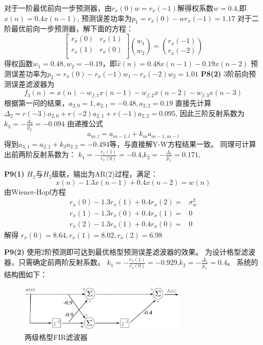 \documentclass{article}
\begin{document}
 对于一阶最优前向一步预测器，由$r_x(0)w=r_x(-1)$解得权系数$w=0.4$,即$\hat{x}(n)=0.4x(n-1)$,
 预测误差功率为$p_1=r_x(0)-wr_x(-1)=1.17$
 对于二阶最优前向一步预测器，解下面的方程：
\begin{equation}
\begin{bmatrix}
r_x(0) & r_x(1)\\
r_x(1) & r_x(0)\\
\end{bmatrix}\binom{w_1}{w_2}=
\binom{r_{x}(-1)}{r_{x}(-2)}
\end{equation}
得权函数$w_1=0.48,w_2=-0.19$，即$\hat{x}(n)=0.48x(n-1)-0.19x(n-2)$
预测误差功率为$p_2=r_x(0)-r_x(-1)w_1-r_x(-2)w_2=1.01$
\textbf{P8(2)}
3阶前向预测误差滤波器为
 \begin{equation}
f_3(n)=x(n)-w_{f,1}x(n-1)-w_{f,2}x(n-2)-w_{f,3}x(n-3) 
\end{equation}
根据第一问的结果，$a_{2,0}=1,a_{2,1}=-0.48,a_{2,2}=0.19$
直接先计算$\Delta_2=r(-3)a_{2,0}+r(-2)a_{2,1}+r(-1)a_{2,2}=0.095$,
因此三阶反射系数为$k_3=-\frac{\Delta_2}{p_2}=-0.094$
由递推公式
\begin{equation}
a_{m,l}=a_{m-1,l}+k_m a_{m-1,m-l}
\end{equation}
得到$a_{3,1}=a_{2,1}+k_3 a_{2,2}=-0.494$等，与直接解Y-W方程结果一致。
同理可计算出前两阶反射系数为：
$k_1=-\frac{r_x(1)}{r_x(0)}=-0.4$,$k_2=-\frac{\Delta_1}{p_1}=0.171$,


\textbf{P9(1)}
$H_1$与$H_2$级联，输出为AR(2)过程，满足： 
\begin{equation}
x(n)-1.3x(n-1)+0.4x(n-2)=w(n)
\end{equation}
由Wiener-Hopf方程
\begin{align*}
r_x(0)-1.3r_x(1)+0.4r_x(2)= & \sigma_w^2 \\
r_x(1)-1.3r_x(0)+0.4r_x(1)= & 0 \\
r_x(2)-1.3r_x(1)+0.4r_x(0)= & 0
\end{align*}
解得 $r_x(0)=8.64,r_x(1)=8.02,r_x(2)=6.98$

\textbf{P9(2)}
使用2阶预测即可达到最优格型预测误差滤波器的效果。
为设计格型滤波器，只需确定前两阶反射系数。
$k_1=-\frac{r_x(1)}{r_x(0)}=-0.929$,$k_2=-\frac{\Delta_1}{p_1}=0.4$。
系统的结构图如下：
\begin{figure}[!ht]
 \centering
 \includegraphics[width=8cm]{gridFilter.eps}
 \caption{两级格型FIR滤波器}
\end{figure}
\end{document}
